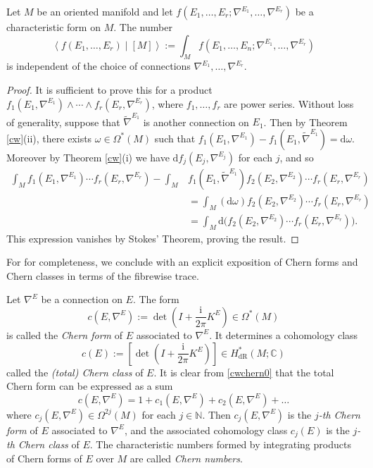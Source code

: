 \documentclass[a4paper,openany]{scrbook}
\newcommand{\ud}{\mathrm{d}}
\newcommand{\ui}{\mathrm{i}}
\begin{document}
\begin{thm}
Let $M$ be an oriented manifold and let $f(E_1,\dots,E_r;\nabla^{E_1},\dots,\nabla^{E_r})$ be a characteristic form on $M$. The number
\begin{equation}
\left\langle f(E_1,\dots,E_r)\middle|[M]\right\rangle:=\int_Mf(E_1,\dots,E_n;\nabla^{E_1},\dots,\nabla^{E_r})
\end{equation}
is independent of the choice of connections $\nabla^{E_1},\dots,\nabla^{E_r}$.
\end{thm}
\begin{proof}
It is sufficient to prove this for a product $f_1(E_1,\nabla^{E_1})\wedge\cdots\wedge f_r(E_r,\nabla^{E_r})$, where $f_1,\dots,f_r$ are power series. Without loss of generality, suppose that $\tilde{\nabla}^{E_1}$ is another connection on $E_1$. Then by Theorem \ref{cw}(ii), there exists $\omega\in\Omega^*(M)$ such that $f_1(E_1,\nabla^{E_1})-f_1(E_1,\tilde{\nabla}^{E_1})=\ud\omega$. Moreover by Theorem \ref{cw}(i) we have $\ud f_j(E_j,\nabla^{E_j})$ for each $j$, and so
\begin{align*}
\int_Mf_1(E_1,\nabla^{E_1})\cdots f_r(E_r,\nabla^{E_r})-\int_M&f_1(E_1,\tilde{\nabla}^{E_1})f_2(E_2,\nabla^{E_2})\cdots f_r(E_r,\nabla^{E_r})\\
&=\int_M(\ud\omega)f_2(E_2,\nabla^{E_2})\cdots f_r(E_r,\nabla^{E_r})\\
&=\int_M\ud\Big(f_2(E_2,\nabla^{E_2})\cdots f_r(E_r,\nabla^{E_r})\Big).
\end{align*}
This expression vanishes by Stokes' Theorem, proving the result.
\end{proof}


For for completeness, we conclude with an explicit exposition of Chern forms and Chern classes in terms of the fibrewise trace.

\begin{defn}
Let $\nabla^E$ be a connection on $E$. The form
\begin{equation}
c(E,\nabla^E):=\det\left(I+\frac{\ui}{2\pi}K^E\right)\in\Omega^*(M)
\end{equation}
is called the \emph{Chern form} of $E$ associated to $\nabla^E$. It determines a cohomology class
\begin{equation}
c(E):=\left[\det\left(I+\frac{\ui}{2\pi}K^E\right)\right]\in H_\text{dR}^*(M;\mathbb{C})
\end{equation}
called the \emph{(total) Chern class} of $E$. It is clear from \eqref{cwchern0} that the total Chern form can be expressed as a sum
\begin{equation}
c(E,\nabla^E)=1+c_1(E,\nabla^E)+c_2(E,\nabla^E)+\dots
\end{equation}
where $c_j(E,\nabla^E)\in\Omega^{2j}(M)$ for each $j\in\mathbb{N}$. Then $c_j(E,\nabla^E)$ is the \emph{$j$-th Chern form} of $E$ associated to $\nabla^E$, and the associated cohomology class $c_j(E)$ is the \emph{$j$-th Chern class} of $E$. The characteristic numbers formed by integrating products of Chern forms of $E$ over $M$ are called \emph{Chern numbers}.
\end{defn}
\end{document}
